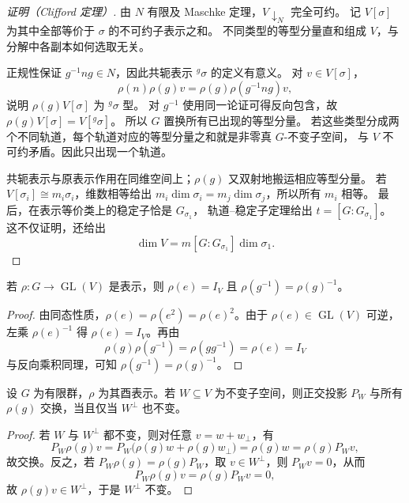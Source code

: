 \begin{proof}[证明（Clifford 定理）]
由 $N$ 有限及 Maschke 定理，$V\downarrow_N$ 完全可约。
记 $V[\sigma]$ 为其中全部等价于 $\sigma$ 的不可约子表示之和。
不同类型的等型分量直和组成 $V$，与分解中各副本如何选取无关。

正规性保证 $g^{-1}ng\in N$，因此共轭表示 ${}^{g}\sigma$ 的定义有意义。
对 $v\in V[\sigma]$，
\[
\rho(n)\rho(g)v=\rho(g)\rho(g^{-1}ng)v,
\]
说明 $\rho(g)V[\sigma]$ 为 ${}^{g}\sigma$ 型。
对 $g^{-1}$ 使用同一论证可得反向包含，故
$\rho(g)V[\sigma]=V[{}^{g}\sigma]$。
所以 $G$ 置换所有已出现的等型分量。
若这些类型分成两个不同轨道，每个轨道对应的等型分量之和就是非零真 $G$-不变子空间，
与 $V$ 不可约矛盾。因此只出现一个轨道。

共轭表示与原表示作用在同维空间上；$\rho(g)$ 又双射地搬运相应等型分量。
若 $V[\sigma_i]\cong m_i\sigma_i$，维数相等给出
$m_i\dim\sigma_i=m_j\dim\sigma_j$，所以所有 $m_i$ 相等。
最后，在表示等价类上的稳定子恰是 $G_{\sigma_1}$，
轨道--稳定子定理给出 $t=[G:G_{\sigma_1}]$。
这不仅证明，还给出
\[
\dim V=m[G:G_{\sigma_1}]\dim\sigma_1.
\]
\end{proof}\par\medskip

\begin{proposition}
若 $\rho:G\to\operatorname{GL}(V)$ 是表示，则 $\rho(e)=I_V$ 且 $\rho(g^{-1})=\rho(g)^{-1}$。
\end{proposition}

\begin{proof}
由同态性质，$\rho(e)=\rho(e^2)=\rho(e)^2$。由于 $\rho(e)\in \operatorname{GL}(V)$ 可逆，左乘 $\rho(e)^{-1}$ 得 $\rho(e)=I_V$。再由
\[
\rho(g)\rho(g^{-1})=\rho(gg^{-1})=\rho(e)=I_V
\]
与反向乘积同理，可知 $\rho(g^{-1})=\rho(g)^{-1}$。
\end{proof}

\begin{proposition}
设 $G$ 为有限群，$\rho$ 为其酉表示。若 $W\subseteq V$ 为不变子空间，则正交投影 $P_W$ 与所有 $\rho(g)$ 交换，当且仅当 $W^{\perp}$ 也不变。
\end{proposition}

\begin{proof}
若 $W$ 与 $W^{\perp}$ 都不变，则对任意 $v=w+w_\perp$，有
\[
P_W\rho(g)v=P_W\bigl(\rho(g)w+\rho(g)w_\perp\bigr)=\rho(g)w=\rho(g)P_Wv,
\]
故交换。反之，若 $P_W\rho(g)=\rho(g)P_W$，取 $v\in W^{\perp}$，则 $P_Wv=0$，从而
\[
P_W\rho(g)v=\rho(g)P_Wv=0,
\]
故 $\rho(g)v\in W^{\perp}$，于是 $W^{\perp}$ 不变。
\end{proof}

